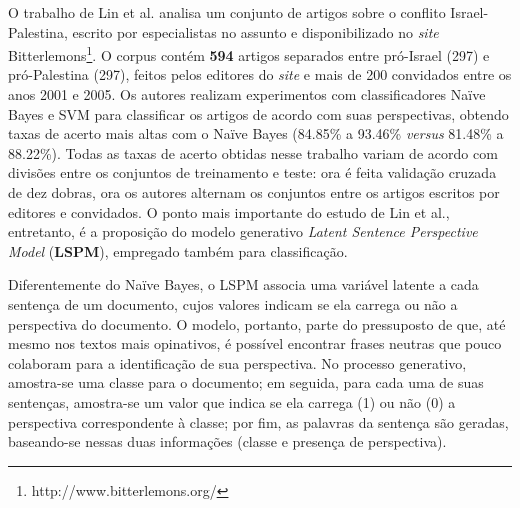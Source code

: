 O trabalho de Lin et al. analisa um conjunto de artigos sobre o conflito Israel-Palestina, escrito por especialistas no assunto e disponibilizado no \emph{site} Bitterlemons\footnote{http://www.bitterlemons.org/}. O corpus contém \textbf{594} artigos separados entre pró-Israel (297) e pró-Palestina (297),  feitos pelos editores do \emph{site} e mais de 200 convidados entre os anos 2001 e 2005. Os autores realizam experimentos com classificadores Naïve Bayes e SVM para classificar os artigos de acordo com suas perspectivas, obtendo taxas de acerto mais altas com o Naïve Bayes (84.85\% a 93.46\% \emph{versus} 81.48\% a 88.22\%). Todas as taxas de acerto obtidas nesse trabalho variam de acordo com divisões entre os conjuntos de treinamento e teste: ora é feita validação cruzada de dez dobras, ora os autores alternam os conjuntos entre os artigos escritos por editores e convidados. O ponto mais importante do estudo de Lin et al., entretanto, é a proposição do modelo generativo \emph{Latent Sentence Perspective Model} (\textbf{LSPM}), empregado também para classificação. %


Diferentemente do Naïve Bayes, o LSPM associa uma variável latente a cada sentença de um documento, cujos valores indicam se ela carrega ou não a perspectiva do documento. O modelo, portanto, parte do pressuposto de que, até mesmo nos textos mais opinativos, é possível encontrar frases neutras que pouco colaboram para a identificação de sua perspectiva. No processo generativo, amostra-se uma classe para o documento; em seguida, para cada uma de suas sentenças, amostra-se um valor que indica se ela carrega (1) ou não (0) a perspectiva correspondente à classe; por fim, as palavras da sentença são geradas, baseando-se nessas duas informações (classe e presença de perspectiva).


